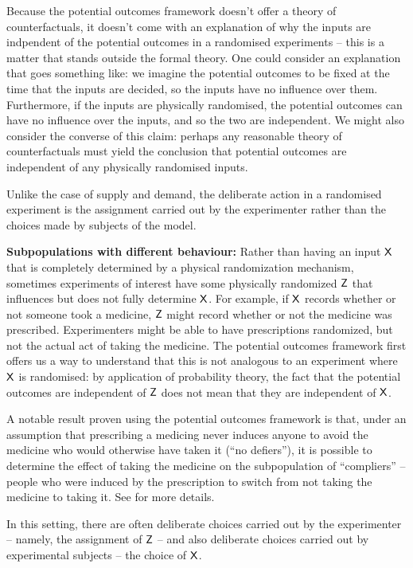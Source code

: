 Because the potential outcomes framework doesn't offer a theory of counterfactuals, it doesn't come with an explanation of why the inputs are indpendent of the potential outcomes in a randomised experiments -- this is a matter that stands outside the formal theory. One could consider an explanation that goes something like: we imagine the potential outcomes to be fixed at the time that the inputs are decided, so the inputs have no influence over them. Furthermore, if the inputs are physically randomised, the potential outcomes can have no influence over the inputs, and so the two are independent. We might also consider the converse of this claim: perhaps any reasonable theory of counterfactuals must yield the conclusion that potential outcomes are independent of any physically randomised inputs.

Unlike the case of supply and demand, the deliberate action in a randomised experiment is the assignment carried out by the experimenter rather than the choices made by subjects of the model.

\textbf{Subpopulations with different behaviour:} Rather than having an input $\mathsf{X}$ that is completely determined by a physical randomization mechanism, sometimes experiments of interest have some physically randomized $\mathsf{Z}$ that influences but does not fully determine $\mathsf{X}$. For example, if $\mathsf{X}$ records whether or not someone took a medicine, $\mathsf{Z}$ might record whether or not the medicine was prescribed. Experimenters might be able to have prescriptions randomized, but not the actual act of taking the medicine. The potential outcomes framework first offers us a way to understand that this is not analogous to an experiment where $\mathsf{X}$ is randomised: by application of probability theory, the fact that the potential outcomes are independent of $\mathsf{Z}$ does not mean that they are independent of $\mathsf{X}$.

A notable result proven using the potential outcomes framework is that, under an assumption that prescribing a medicing never induces anyone to avoid the medicine who would otherwise have taken it (``no defiers''), it is possible to determine the effect of taking the medicine on the subpopulation of ``compliers'' -- people who were induced by the prescription to switch from not taking the medicine to taking it. See \cite{imbens_identification_1994} for more details.

In this setting, there are often deliberate choices carried out by the experimenter -- namely, the assignment of $\mathsf{Z}$ -- and also deliberate choices carried out by experimental subjects -- the choice of $\mathsf{X}$.

